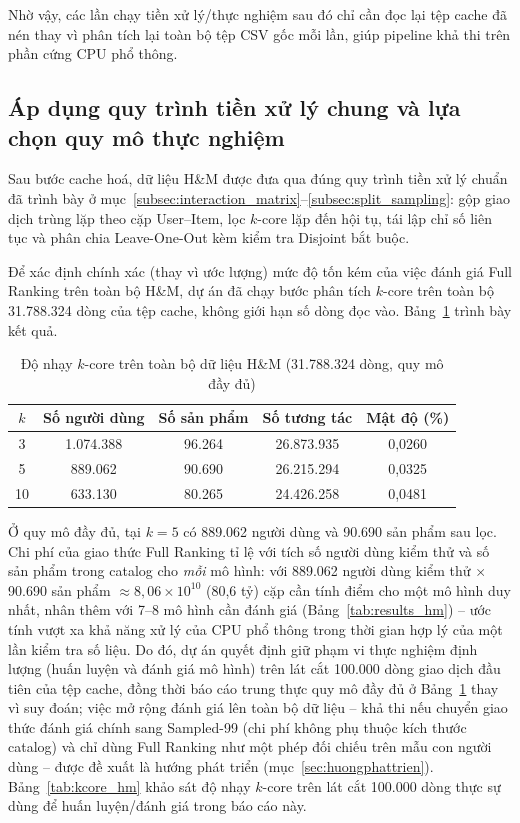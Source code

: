 Nhờ vậy, các lần chạy tiền xử lý/thực nghiệm sau đó chỉ cần đọc lại tệp cache đã nén thay vì phân tích lại toàn bộ tệp CSV gốc mỗi lần, giúp pipeline khả thi trên phần cứng CPU phổ thông.

\subsection{Áp dụng quy trình tiền xử lý chung và lựa chọn quy mô thực nghiệm}
\label{subsec:hm_apply}

Sau bước cache hoá, dữ liệu H\&M được đưa qua đúng quy trình tiền xử lý chuẩn đã trình bày ở mục~\ref{subsec:interaction_matrix}--\ref{subsec:split_sampling}: gộp giao dịch trùng lặp theo cặp User--Item, lọc $k$-core lặp đến hội tụ, tái lập chỉ số liên tục và phân chia Leave-One-Out kèm kiểm tra Disjoint bắt buộc.

Để xác định chính xác (thay vì ước lượng) mức độ tốn kém của việc đánh giá Full Ranking trên toàn bộ H\&M, dự án đã chạy bước phân tích $k$-core trên toàn bộ 31.788.324 dòng của tệp cache, không giới hạn số dòng đọc vào. Bảng~\ref{tab:kcore_hm_full} trình bày kết quả.

\begin{table}[htbp]
    \centering
    \caption{Độ nhạy $k$-core trên toàn bộ dữ liệu H\&M (31.788.324 dòng, quy mô đầy đủ)}
    \label{tab:kcore_hm_full}
    \begin{tabular}{|c|c|c|c|c|}
        \hline
        \textbf{$k$} & \textbf{Số người dùng} & \textbf{Số sản phẩm} & \textbf{Số tương tác} & \textbf{Mật độ (\%)} \\
        \hline
        3 & 1.074.388 & 96.264 & 26.873.935 & 0,0260 \\
        \hline
        5 & 889.062 & 90.690 & 26.215.294 & 0,0325 \\
        \hline
        10 & 633.130 & 80.265 & 24.426.258 & 0,0481 \\
        \hline
    \end{tabular}
\end{table}

Ở quy mô đầy đủ, tại $k=5$ có 889.062 người dùng và 90.690 sản phẩm sau lọc. Chi phí của giao thức Full Ranking tỉ lệ với tích số người dùng kiểm thử và số sản phẩm trong catalog cho \emph{mỗi} mô hình: với 889.062 người dùng kiểm thử $\times$ 90.690 sản phẩm $\approx 8,06 \times 10^{10}$ (80,6 tỷ) cặp cần tính điểm cho một mô hình duy nhất, nhân thêm với 7--8 mô hình cần đánh giá (Bảng~\ref{tab:results_hm}) -- ước tính vượt xa khả năng xử lý của CPU phổ thông trong thời gian hợp lý của một lần kiểm tra số liệu. Do đó, dự án quyết định giữ phạm vi thực nghiệm định lượng (huấn luyện và đánh giá mô hình) trên lát cắt 100.000 dòng giao dịch đầu tiên của tệp cache, đồng thời báo cáo trung thực quy mô đầy đủ ở Bảng~\ref{tab:kcore_hm_full} thay vì suy đoán; việc mở rộng đánh giá lên toàn bộ dữ liệu -- khả thi nếu chuyển giao thức đánh giá chính sang Sampled-99 (chi phí không phụ thuộc kích thước catalog) và chỉ dùng Full Ranking như một phép đối chiếu trên mẫu con người dùng -- được đề xuất là hướng phát triển (mục~\ref{sec:huongphattrien}). Bảng~\ref{tab:kcore_hm} khảo sát độ nhạy $k$-core trên lát cắt 100.000 dòng thực sự dùng để huấn luyện/đánh giá trong báo cáo này.

